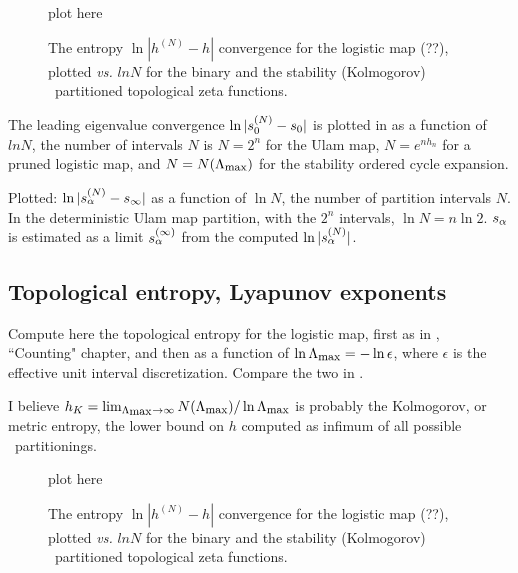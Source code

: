 \begin{figure}
\begin{center}
plot here %
\end{center}
\caption{
    {\small
The entropy $\ln | h^{(N)} - h|$
convergence for the
logistic map (??), plotted {\em vs.} $ln N$
for the binary and the stability (Kolmogorov) \statesp\ partitioned
topological zeta functions.
        }}
\label{fig:logStabOrder1}
\end{figure}

The leading eigenvalue convergence
$\ln |s_0^{(N)} - s_0|$ is plotted in
 as a function of
$ln N$,
the number of intervals $N$ is $N = 2^{n}$ for the Ulam map,
$N =e^{n h_n}$ for a pruned logistic map, and $N = N(\stabCutoff)$
for the stability ordered cycle expansion.

Plotted:
$\ln |s_\alpha^{(N)}-s_\infty|$
as a function of $\ln N$,
the number of partition intervals $N$.
In the deterministic
Ulam map partition, with the $2^n$ intervals,
$\ln N= n \ln 2$.
$s_\alpha$ is estimated as a limit
$s_\alpha^{(\infty)}$ from the computed
$\ln |s_\alpha^{(N)}|$.



\subsection{Topological entropy, Lyapunov exponents}
\label{s-StOrdKS}

Compute here the topological entropy for the logistic map, first
as in \wwwcb, ``Counting" chapter, and then as a function of
$\ln \stabCutoff = - \ln \epsilon$, where $ \epsilon$ is the
effective unit interval discretization.
Compare the two in
.

I believe
$h_K = \lim_{{\stabCutoff} \to \infty} N(\stabCutoff)/\ln \stabCutoff$
is probably the Kolmogorov, or metric entropy, the lower bound on
$h$ computed as infimum of all possible \statesp\ partitionings.


\begin{figure}
\begin{center}
plot here %
\end{center}
\caption{
    {\small
The entropy $\ln | h^{(N)} - h|$
convergence for the
logistic map (??), plotted {\em vs.} $ln N$
for the binary and the stability (Kolmogorov) \statesp\ partitioned
topological zeta functions.
        }}
\label{fig:EntrStabOrder1}
\end{figure}



